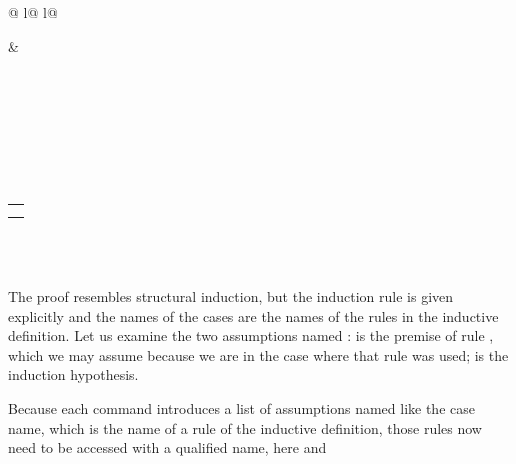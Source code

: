 \begin{isabellebody}
\begin{tabular}{@ {}l@ {\qquad}l@ {}}
\begin{minipage}[t]{.5\textwidth}
\end{minipage}
&
\begin{minipage}[t]{.5\textwidth}
~\\
~\\
 \\
~\\
~\\
 \\
 
  \begin{tabular}[t]{l} \isa{ev\ n}\\\isa{even\ n}\end{tabular}\\
 \\
\end{minipage}
\end{tabular}
\medskip
%
\begin{isamarkuptext}%
The proof resembles structural induction, but the induction rule is given
explicitly and the names of the cases are the names of the rules in the
inductive definition.
Let us examine the two assumptions named :
 is the premise of rule , which we may assume
because we are in the case where that rule was used; 
is the induction hypothesis.
\begin{warn}
Because each  command introduces a list of assumptions
named like the case name, which is the name of a rule of the inductive
definition, those rules now need to be accessed with a qualified name, here
 and 
\end{warn}


\end{isamarkuptext}
\end{isabellebody}
